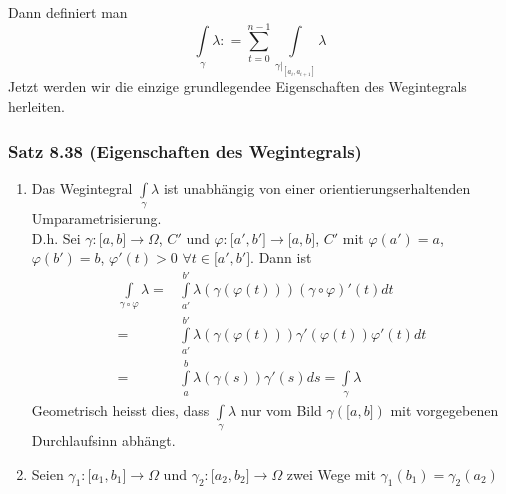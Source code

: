 \begin{enumerate}
Dann definiert man
\[\int\limits_\gamma  \lambda  : = \sum\limits_{t = 0}^{n - 1} {\int\limits_{{{\left. \gamma  \right|}_{\left[ {{a_i},{a_{i + 1}}} \right]}}} \lambda  } \]
Jetzt werden wir die einzige grundlegendee Eigenschaften des Wegintegrals herleiten.
\end{enumerate}

\subsubsection*{Satz 8.38 (Eigenschaften des Wegintegrals)}
\begin{enumerate}[\indent E1)]
\item Das Wegintegral $\int\limits_\gamma  \lambda  $ ist unabhängig von einer orientierungserhaltenden Umparametrisierung. \\
D.h. Sei $\gamma :\lbrack a,b\rbrack\to\Omega$, $C'$ und $\varphi :\lbrack a',b'\rbrack\to\lbrack a,b\rbrack$, $C'$ mit $\varphi\left( a'\right)=a$, $\varphi\left( b'\right)=b$, $\varphi'\left( t\right) >0$ $\forall t\in\lbrack a', b'\rbrack$. Dann ist
\begin{align*}
\int\limits_{\gamma  \circ \varphi } \lambda   = &\int\limits_{a'}^{b'} {\lambda \left( {\gamma \left( {\varphi (t)} \right)} \right)\left( {\gamma  \circ \varphi } \right)'(t)dt} \\
 = &\int\limits_{a'}^{b'} {\lambda \left( {\gamma \left( {\varphi (t)} \right)} \right)\gamma '\left( {\varphi (t)} \right)\varphi '(t)dt} \\
 = &\int\limits_a^b {\lambda \left( {\gamma \left( s \right)} \right)\gamma '\left( s \right)ds = \int\limits_\gamma  \lambda  }
\end{align*}
Geometrisch heisst dies, dass $\int\limits_\gamma  \lambda$ nur vom Bild $\gamma\left( \lbrack a,b\rbrack\right)$ mit vorgegebenen Durchlaufsinn abhängt.
\item Seien $\gamma_1:\lbrack a_1,b_1\rbrack\to\Omega$ und $\gamma_2:\lbrack a_2,b_2\rbrack\to\Omega$ zwei Wege mit $\gamma_1\left( b_1\right)=\gamma_2\left(a_2\right)$
\begin{center}
\end{center}
\end{enumerate}
